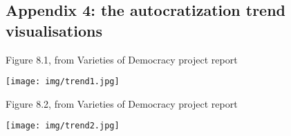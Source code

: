 \documentclass[a4paper, 12pt]{article}
\begin{document}
    
    \newpage
    
    \newpage
    \subsection*{Appendix 4: the autocratization trend visualisations}
    \begin{center}
        Figure 8.1, from Varieties of Democracy project report \parencite{vdem}
        
        \texttt{[image: img/trend1.jpg]}    
    \end{center}
    
    \begin{center}
        Figure 8.2, from Varieties of Democracy project report \parencite{vdem}
        
        \texttt{[image: img/trend2.jpg]}    
    \end{center}
        

	
	
	
    \newpage
    \printbibliography
\end{document}
